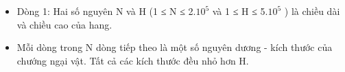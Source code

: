 \begin{itemize}
	\item Dòng 1: Hai số nguyên N và H (1 ≤ N ≤ 2.$10^{5}$ và 1 ≤ H ≤ 5.$10^{5}$ ) là chiều dài và chiều cao của hang.
	\item Mỗi dòng trong N dòng tiếp theo là một số nguyên dương - kích thước của chướng ngại vật. Tất cả các kích thước đều nhỏ hơn H.
\end{itemize}